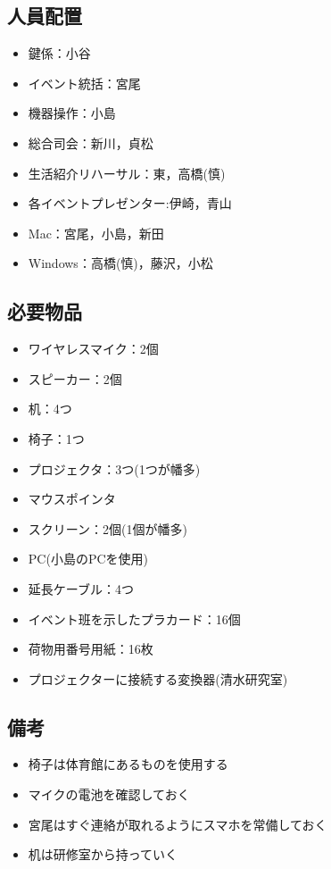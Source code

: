 \subsection{人員配置}
\begin{itemize}
\item 鍵係：小谷
\item イベント統括：宮尾
\item 機器操作：小島
\item 総合司会：新川，貞松
\item 生活紹介リハーサル：東，高橋(慎)
\item 各イベントプレゼンター:伊崎，青山
\item Mac：宮尾，小島，新田
\item Windows：高橋(慎)，藤沢，小松
\end{itemize}




\subsection{必要物品}
\begin{itemize}
\item ワイヤレスマイク：2個
\item スピーカー：2個
\item 机：4つ
\item 椅子：1つ
\item プロジェクタ：3つ(1つが幡多)
\item マウスポインタ
\item スクリーン：2個(1個が幡多)
\item PC(小島のPCを使用)
\item 延長ケーブル：4つ
\item イベント班を示したプラカード：16個
\item 荷物用番号用紙：16枚
\item プロジェクターに接続する変換器(清水研究室)
\end{itemize}


\subsection{備考}
\begin{itemize}
\item 椅子は体育館にあるものを使用する
\item マイクの電池を確認しておく
\item 宮尾はすぐ連絡が取れるようにスマホを常備しておく
\item 机は研修室から持っていく
\end{itemize}

%
